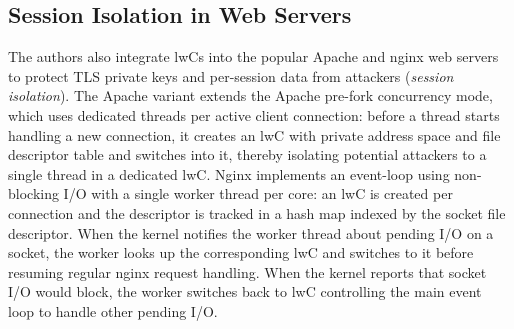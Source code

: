 \documentclass[10pt,twocolumn,a4paper]{article}
\begin{document}
\subsection{Session Isolation in Web Servers}\label{eval:web}
The authors also integrate lwCs into the popular Apache and nginx web servers to protect TLS private keys and per-session data from attackers (\textit{session isolation}).
The Apache variant extends the Apache pre-fork concurrency mode, which uses dedicated threads per active client connection:
before a thread starts handling a new connection, it creates an lwC with private address space and file descriptor table and switches into it, thereby isolating potential attackers to a single thread in a dedicated lwC.
Nginx implements an event-loop using non-blocking I/O with a single worker thread per core:
an lwC is created per connection and the descriptor is tracked in a hash map indexed by the socket file descriptor.
When the kernel notifies the worker thread about pending I/O on a socket, the worker looks up the corresponding lwC and switches to it before resuming regular nginx request handling.
When the kernel reports that socket I/O would block, the worker switches back to lwC controlling the main event loop to handle other pending I/O.
\cite{lwcpaper}

\end{document}
